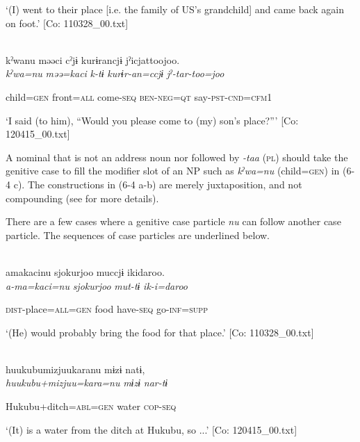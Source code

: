 \glt ‘(I) went to their place [i.e. the family of US’s grandchild] and came back again on foot.’ [Co: 110328\_00.txt]
\z
\z

 \ex{}\\
{\TM}
\gll  kˀwanu  məəci  cˀjɨ  kurɨrancjɨ  jˀicjattoojoo.\\

      \textit{kˀwa=nu}  \textit{məə=kaci}  \textit{k-tɨ}  \textit{kurɨr-an=ccjɨ}  \textit{jˀ-tar-too=joo}

      child=\textsc{gen}  front=\textsc{all}  come-\textsc{seq}  \textsc{ben}-\textsc{neg}=\textsc{qt}  say-\textsc{pst}-\textsc{cnd}=\textsc{cfm}1

\glt ‘I said (to him), “Would you please come to (my) son’s place?”’ [Co: 120415\_00.txt]
\z

A nominal that is not an address noun nor followed by \textit{{}-taa} (\textsc{pl}) should take the genitive case to fill the modifier slot of an NP such as \textit{kˀwa=nu} (child=\textsc{gen}) in (6-4 c). The constructions in (6-4 a-b) are merely juxtaposition, and not compounding (see  for more details).

  There are a few cases where a genitive case particle \textit{nu} can follow another case particle. The sequences of case particles are underlined below.

\ea\label{ex:6-5}
\ea{}\\
\gll  {\TM}  amakacinu  {\textbar}sjokurjoo{\textbar}  muccjɨ  ikidaroo.\\

      \textit{a-ma=kaci=nu}  \textit{sjokurjoo}  \textit{mut-tɨ}  \textit{ik-i=daroo}

      \textsc{dist}-place=\textsc{all}=\textsc{gen}  food  have-\textsc{seq}  go-\textsc{inf}=\textsc{supp}

\glt ‘(He) would probably bring the food for that place.’ [Co: 110328\_00.txt]
\z

 \ex{}\\
{\TM}
\gll  huukubumizjuukaranu  mɨzɨ  natɨ,\\

      \textit{huukubu+mizjuu=kara=nu}  \textit{mɨzɨ}  \textit{nar-tɨ}

      Hukubu+ditch=\textsc{abl}=\textsc{gen}  water  \textsc{cop}-\textsc{seq}

\glt ‘(It) is a water from the ditch at Hukubu, so ...’ [Co: 120415\_00.txt]
\z

